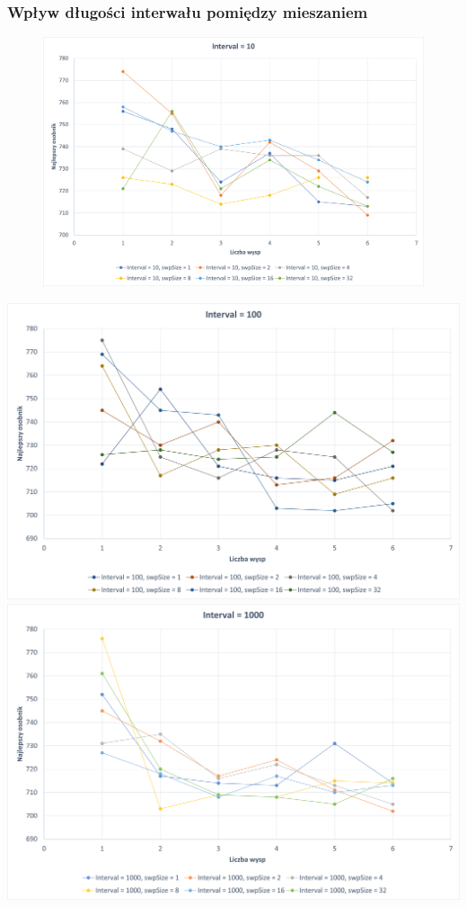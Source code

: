 \documentclass{article}
\begin{document}
\subsubsection*{Wpływ długości interwału pomiędzy mieszaniem}
\begin{figure}[H]
\includegraphics[width=\textwidth]{Interval=10.png}
\end{figure}
\includegraphics[width=\textwidth]{Interval=100.png}
\includegraphics[width=\textwidth]{Interval=1000.png}
\end{document}
